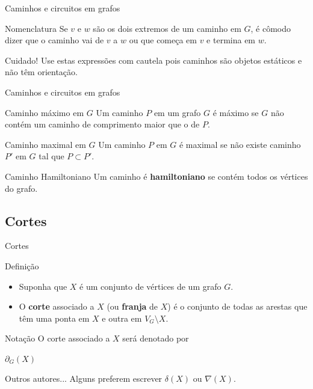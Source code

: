 \documentclass[xcolor=dvipsnames,table]{beamer}
\begin{document}
	\begin{frame}{Caminhos e circuitos em grafos}
		\begin{block}{Nomenclatura}
			Se $v$ e $w$ são os dois extremos de um caminho em $G$, é cômodo dizer que o caminho vai de $v$ a $w$ ou que começa em $v$ e termina em $w$.
		\end{block}
		\begin{alertblock}{Cuidado!}
			Use estas expressões com cautela pois caminhos são objetos estáticos e não têm orientação.
		\end{alertblock}
	\end{frame}
	
	\begin{frame}{Caminhos e circuitos em grafos}
		\begin{block}{Caminho máximo em $G$}
			Um caminho $P$ em um grafo $G$ é máximo se $G$ não contém um caminho de comprimento maior que o de $P$.
		\end{block}
		\begin{block}{Caminho maximal em $G$}
			Um caminho $P$ em $G$ é maximal se não existe caminho $P'$ em $G$ tal que $P \subset P'$.
		\end{block}
		\begin{block}{Caminho Hamiltoniano}
			Um caminho é {\bf hamiltoniano} se contém todos os vértices do grafo.
		\end{block}
	\end{frame}	
	
	\subsection{Cortes}
	\begin{frame}{Cortes}
		\begin{block}{Definição}
			\begin{itemize}
				\item Suponha que $X$ é um conjunto de vértices de um grafo $G$.
				\item O {\bf corte} associado a $X$ (ou {\bf franja} de $X$) é o conjunto de todas as arestas que têm uma ponta em $X$ e outra em $V_G \setminus X$.
			\end{itemize}
		\end{block}
		\begin{block}{Notação}
			O corte associado a $X$ será denotado por
			\begin{center}
				$\partial_G (X)$
			\end{center}
		\end{block} 
		\begin{alertblock}{Outros autores...}
			Alguns preferem escrever $\delta(X)$ ou $\nabla(X)$.
		\end{alertblock}
	\end{frame}
	
\end{document}
